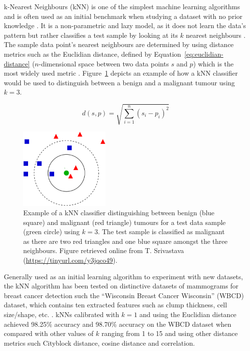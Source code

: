 k-Nearest Neighbours (kNN) is one of the simplest machine learning algorithms and is often used as an initial benchmark when studying a dataset with no prior knowledge \citep{peterson2009k}. It is a non-parametric and lazy model, as it does not learn the data's pattern but rather classifies a test sample by looking at its $k$ nearest neighbours \citep{Yue2018}. The sample data point's nearest neighbours are determined by using distance metrics such as the Euclidian distance, defined by Equation~\ref{eq:euclidian-distance} ($n$-dimensional space between two data points $s$ and $p$) which is the most widely used metric \citep{peterson2009k}. Figure~\ref{fig:litsurvey-knn-example} depicts an example of how a kNN classifier would be used to distinguish between a benign and a malignant tumour using $k=3$.

\begin{equation}
\label{eq:euclidian-distance}
    d(s,p)=\sqrt{\sum_{i=1}^{n}(s_i-p_i)^2}
\end{equation}

\begin{figure}[h]
\centerline{\includegraphics[width=0.4\textwidth]{figures/litsurvey/knn.png}}
\caption{\label{fig:litsurvey-knn-example}Example of a kNN classifier distinguishing between benign (blue square) and malignant (red triangle) tumours for a test data sample (green circle) using $k=3$. The test sample is classified as malignant as there are two red triangles and one blue square amongst the three neighbours. Figure retrieved online from T. Srivastava (\url{https://tinyurl.com/y3jqco49}).}
\end{figure}

Generally used as an initial learning algorithm to experiment with new datasets, the kNN algorithm has been tested on distinctive datasets of mammograms for breast cancer detection such the ``Wisconsin Breast Cancer Wisconsin'' (WBCD) dataset, which contains ten extracted features such as clump thickness, cell size/shape, etc. \citep{Wolberg1995}. kNNs calibrated with $k=1$ and using the Euclidian distance achieved 98.25\% accuracy \citep{Sarkar2000} and 98.70\% accuracy \citep{AhmedMedjahed2013} on the WBCD dataset when compared with other values of $k$ ranging from 1 to 15 and using other distance metrics such Cityblock distance, cosine distance and correlation.\\

